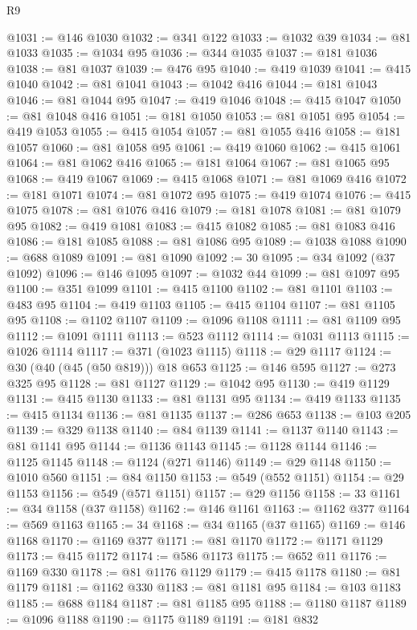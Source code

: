 \begin{lexlean}{R9}
\begin{coremodule}
@1031 := @146 @1030
@1032 := @341 @122
@1033 := @1032 @39
@1034 := @81 @1033
@1035 := @1034 @95
@1036 := @344 @1035
@1037 := @181 @1036
@1038 := @81 @1037
@1039 := @476 @95
@1040 := @419 @1039
@1041 := @415 @1040
@1042 := @81 @1041
@1043 := @1042 @416
@1044 := @181 @1043
@1046 := @81 @1044 @95
@1047 := @419 @1046
@1048 := @415 @1047
@1050 := @81 @1048 @416
@1051 := @181 @1050
@1053 := @81 @1051 @95
@1054 := @419 @1053
@1055 := @415 @1054
@1057 := @81 @1055 @416
@1058 := @181 @1057
@1060 := @81 @1058 @95
@1061 := @419 @1060
@1062 := @415 @1061
@1064 := @81 @1062 @416
@1065 := @181 @1064
@1067 := @81 @1065 @95
@1068 := @419 @1067
@1069 := @415 @1068
@1071 := @81 @1069 @416
@1072 := @181 @1071
@1074 := @81 @1072 @95
@1075 := @419 @1074
@1076 := @415 @1075
@1078 := @81 @1076 @416
@1079 := @181 @1078
@1081 := @81 @1079 @95
@1082 := @419 @1081
@1083 := @415 @1082
@1085 := @81 @1083 @416
@1086 := @181 @1085
@1088 := @81 @1086 @95
@1089 := @1038 @1088
@1090 := @688 @1089
@1091 := @81 @1090
@1092 := 30
@1095 := @34 @1092 (@37 @1092)
@1096 := @146 @1095
@1097 := @1032 @44
@1099 := @81 @1097 @95
@1100 := @351 @1099
@1101 := @415 @1100
@1102 := @81 @1101
@1103 := @483 @95
@1104 := @419 @1103
@1105 := @415 @1104
@1107 := @81 @1105 @95
@1108 := @1102 @1107
@1109 := @1096 @1108
@1111 := @81 @1109 @95
@1112 := @1091 @1111
@1113 := @523 @1112
@1114 := @1031 @1113
@1115 := @1026 @1114
@1117 := @371 (@1023 @1115)
@1118 := @29 @1117
@1124 := @30 (@40 (@45 (@50 @819))) @18 @653
@1125 := @146 @595
@1127 := @273 @325 @95
@1128 := @81 @1127
@1129 := @1042 @95
@1130 := @419 @1129
@1131 := @415 @1130
@1133 := @81 @1131 @95
@1134 := @419 @1133
@1135 := @415 @1134
@1136 := @81 @1135
@1137 := @286 @653
@1138 := @103 @205
@1139 := @329 @1138
@1140 := @84 @1139
@1141 := @1137 @1140
@1143 := @81 @1141 @95
@1144 := @1136 @1143
@1145 := @1128 @1144
@1146 := @1125 @1145
@1148 := @1124 (@271 @1146)
@1149 := @29 @1148
@1150 := @1010 @560
@1151 := @84 @1150
@1153 := @549 (@552 @1151)
@1154 := @29 @1153
@1156 := @549 (@571 @1151)
@1157 := @29 @1156
@1158 := 33
@1161 := @34 @1158 (@37 @1158)
@1162 := @146 @1161
@1163 := @1162 @377
@1164 := @569 @1163
@1165 := 34
@1168 := @34 @1165 (@37 @1165)
@1169 := @146 @1168
@1170 := @1169 @377
@1171 := @81 @1170
@1172 := @1171 @1129
@1173 := @415 @1172
@1174 := @586 @1173
@1175 := @652 @11
@1176 := @1169 @330
@1178 := @81 @1176 @1129
@1179 := @415 @1178
@1180 := @81 @1179
@1181 := @1162 @330
@1183 := @81 @1181 @95
@1184 := @103 @1183
@1185 := @688 @1184
@1187 := @81 @1185 @95
@1188 := @1180 @1187
@1189 := @1096 @1188
@1190 := @1175 @1189
@1191 := @181 @832

\end{coremodule}
\end{lexlean}
